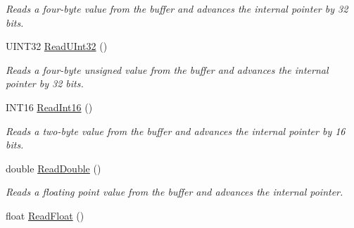 \begin{DoxyCompactItemize}
\begin{DoxyCompactList}\small\item\em Reads a four-\/byte value from the buffer and advances the internal pointer by 32 bits. \end{DoxyCompactList}\item 
\hypertarget{class_rhesus_1_1_toolkit_1_1_net_1_1_net_buffer_ae997bea8f104f6ac4f7d49ae4a5570f9}{U\-I\-N\-T32 \hyperlink{class_rhesus_1_1_toolkit_1_1_net_1_1_net_buffer_ae997bea8f104f6ac4f7d49ae4a5570f9}{Read\-U\-Int32} ()}\label{class_rhesus_1_1_toolkit_1_1_net_1_1_net_buffer_ae997bea8f104f6ac4f7d49ae4a5570f9}

\begin{DoxyCompactList}\small\item\em Reads a four-\/byte unsigned value from the buffer and advances the internal pointer by 32 bits. \end{DoxyCompactList}\item 
\hypertarget{class_rhesus_1_1_toolkit_1_1_net_1_1_net_buffer_a50b025d7b8c8e799a19c3cba431812e3}{I\-N\-T16 \hyperlink{class_rhesus_1_1_toolkit_1_1_net_1_1_net_buffer_a50b025d7b8c8e799a19c3cba431812e3}{Read\-Int16} ()}\label{class_rhesus_1_1_toolkit_1_1_net_1_1_net_buffer_a50b025d7b8c8e799a19c3cba431812e3}

\begin{DoxyCompactList}\small\item\em Reads a two-\/byte value from the buffer and advances the internal pointer by 16 bits. \end{DoxyCompactList}\item 
\hypertarget{class_rhesus_1_1_toolkit_1_1_net_1_1_net_buffer_a99908cf96b8a69214e477b0aa94481e4}{double \hyperlink{class_rhesus_1_1_toolkit_1_1_net_1_1_net_buffer_a99908cf96b8a69214e477b0aa94481e4}{Read\-Double} ()}\label{class_rhesus_1_1_toolkit_1_1_net_1_1_net_buffer_a99908cf96b8a69214e477b0aa94481e4}

\begin{DoxyCompactList}\small\item\em Reads a floating point value from the buffer and advances the internal pointer. \end{DoxyCompactList}\item 
\hypertarget{class_rhesus_1_1_toolkit_1_1_net_1_1_net_buffer_a497f6fad97d316edef5ff0184646469e}{float \hyperlink{class_rhesus_1_1_toolkit_1_1_net_1_1_net_buffer_a497f6fad97d316edef5ff0184646469e}{Read\-Float} ()}\label{class_rhesus_1_1_toolkit_1_1_net_1_1_net_buffer_a497f6fad97d316edef5ff0184646469e}


\end{DoxyCompactItemize}
